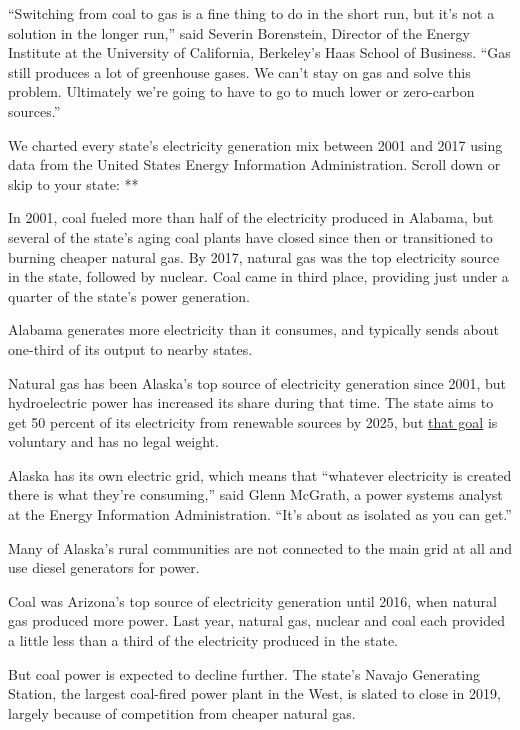 ``Switching from coal to gas is a fine thing to do in the short run, but
it's not a solution in the longer run,'' said Severin Borenstein,
Director of the Energy Institute at the University of California,
Berkeley's Haas School of Business. ``Gas still produces a lot of
greenhouse gases. We can't stay on gas and solve this problem.
Ultimately we're going to have to go to much lower or zero-carbon
sources.''

We charted every state's electricity generation mix between 2001 and
2017 using data from the United States Energy Information
Administration. Scroll down or skip to your state: **

In 2001, coal fueled more than half of the electricity produced in
Alabama, but several of the state's aging coal plants have closed since
then or transitioned to burning cheaper natural gas. By 2017, natural
gas was the top electricity source in the state, followed by nuclear.
Coal came in third place, providing just under a quarter of the state's
power generation.

Alabama generates more electricity than it consumes, and typically sends
about one-third of its output to nearby states.

Natural gas has been Alaska's top source of electricity generation since
2001, but hydroelectric power has increased its share during that time.
The state aims to get 50 percent of its electricity from renewable
sources by 2025, but
\href{http://www.legis.state.ak.us/basis/get_bill_text.asp?hsid=HB0306A\&session=26}{that
goal} is voluntary and has no legal weight.

Alaska has its own electric grid, which means that ``whatever
electricity is created there is what they're consuming,'' said Glenn
McGrath, a power systems analyst at the Energy Information
Administration. ``It's about as isolated as you can get.''

Many of Alaska's rural communities are not connected to the main grid at
all and use diesel generators for power.

Coal was Arizona's top source of electricity generation until 2016, when
natural gas produced more power. Last year, natural gas, nuclear and
coal each provided a little less than a third of the electricity
produced in the state.

But coal power is expected to decline further. The state's Navajo
Generating Station, the largest coal-fired power plant in the West, is
slated to close in 2019, largely because of competition from cheaper
natural gas.

